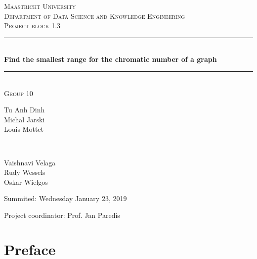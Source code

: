 \documentclass[a4paper]{report}
\begin{document}
	\begin{titlepage} 
		\newcommand{\HRule}{\rule{\linewidth}{0.5mm}} 
		
		\center
		
		\textsc{\LARGE Maastricht University}\\[1.5cm]
		
		\textsc{\Large Department of Data Science and Knowledge Engineering}\\[0.5cm] 
		
		\textsc{\large Project block 1.3}\\[0.5cm] 
		
		\HRule\\[0.4cm]
		
		{\huge\bfseries Find the smallest range for the chromatic number of a graph}\\[0.4cm] 
		
		\HRule\\[1.5cm]
		
		\textsc{\large Group 10}\\[0.5cm]
		
		\begin{minipage}{0.6\textwidth}
			\begin{flushleft}
				Tu Anh Dinh\\Michal Jarski\\Louis Mottet
			\end{flushleft}
		\end{minipage}
		~
		\begin{minipage}{0.3\textwidth}
			\begin{flushleft}
				Vaishnavi Velaga\\Rudy Wessels\\Oskar Wielgos
			\end{flushleft}
		\end{minipage}
	
		 \vspace{1cm}
		Summited: Wednesday January 23, 2019
		\vspace{3cm}
		\begin{flushleft}
			Project coordinator: Prof. Jan Paredis
		\end{flushleft}
		
	\end{titlepage}
	
	\chapter*{Preface}
\end{document}
